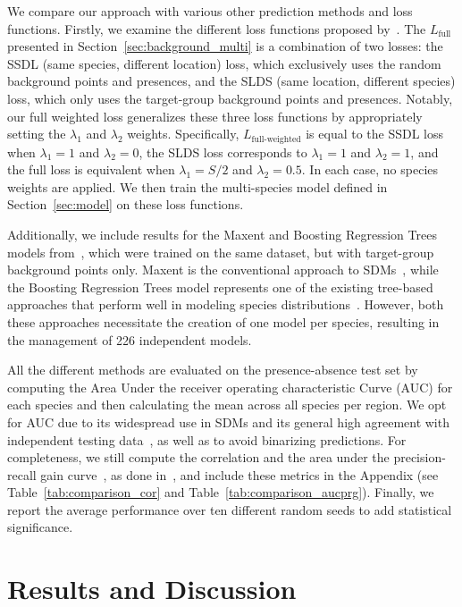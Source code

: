 \documentclass[3p,preprint,12pt]{elsarticle}
\begin{document}
We compare our approach with various other prediction methods and loss functions. Firstly, we examine the different loss functions proposed by~\cite{cole2023spatial}. The $L_{\text{full}}$ presented in Section~\ref{sec:background_multi} is a combination of two losses: the SSDL (same species, different location) loss, which exclusively uses the random background points and presences, and the SLDS (same location, different species) loss, which only uses the target-group background points and presences. Notably, our full weighted loss generalizes these three loss functions by appropriately setting the $\lambda_1$ and $\lambda_2$ weights. Specifically, $L_{\text{full-weighted}}$ is equal to the SSDL loss when $\lambda_1 = 1$ and $\lambda_2 = 0$, the SLDS loss corresponds to $\lambda_1 = 1$ and $\lambda_2 = 1$, and the full loss is equivalent when $\lambda_1 = S/2$ and $\lambda_2 = 0.5$. In each case, no species weights are applied. We then train the multi-species model defined in Section~\ref{sec:model} on these loss functions. 

Additionally, we include results for the Maxent and Boosting Regression Trees models from~\cite{phillips2009sample}, which were trained on the same dataset, but with target-group background points only. Maxent is the conventional approach to SDMs~\citep{phillips2006maximum}, while the Boosting Regression Trees model represents one of the existing tree-based approaches that perform well in modeling species distributions~\citep{valavi2021modelling}. However, both these approaches necessitate the creation of one model per species, resulting in the management of 226 independent models.

All the different methods are evaluated on the presence-absence test set by computing the Area Under the receiver operating characteristic Curve (AUC) for each species and then calculating the mean across all species per region. We opt for AUC due to its widespread use in SDMs and its general high agreement with independent testing data~\citep{konowalik2021evaluation}, as well as to avoid binarizing predictions. For completeness, we still compute the correlation and the area under the precision-recall gain curve~\citep{flach2015precision}, as done in~\cite{valavi2022predictive}, and include these metrics in the Appendix (see Table~\ref{tab:comparison_cor} and Table~\ref{tab:comparison_aucprg}). Finally, we report the average performance over ten different random seeds to add statistical significance.

\section{Results and Discussion}
\label{sec:results}
\end{document}

